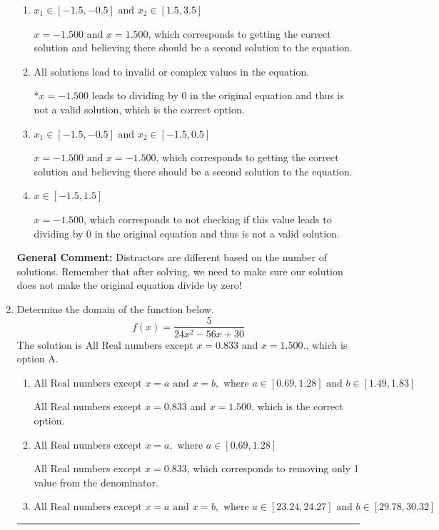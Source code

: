 \documentclass{extbook}[14pt]
\newcommand{\litem}[1]{\item #1

\rule{\textwidth}{0.4pt}}
\begin{document}
\begin{enumerate}
{\begin{enumerate}[label=\Alph*.]
$x = 1.500$, which corresponds to not distributing the factor $28x + 42$ correctly when trying to eliminate the fraction.
\item \( x_1 \in [-1.5, -0.5] \text{ and } x_2 \in [1.5,3.5] \)

$x = -1.500 \text{ and } x = 1.500$, which corresponds to getting the correct solution and believing there should be a second solution to the equation.
\item \( \text{All solutions lead to invalid or complex values in the equation.} \)

*$x = -1.500$ leads to dividing by 0 in the original equation and thus is not a valid solution, which is the correct option.
\item \( x_1 \in [-1.5, -0.5] \text{ and } x_2 \in [-1.5,0.5] \)

$x = -1.500 \text{ and } x = -1.500$, which corresponds to getting the correct solution and believing there should be a second solution to the equation.
\item \( x \in [-1.5,1.5] \)

$x = -1.500$, which corresponds to not checking if this value leads to dividing by 0 in the original equation and thus is not a valid solution.
\end{enumerate}

\textbf{General Comment:} Distractors are different based on the number of solutions. Remember that after solving, we need to make sure our solution does not make the original equation divide by zero!
}
\litem{
Determine the domain of the function below.
\[ f(x) = \frac{5}{24x^{2} -56 x + 30} \]The solution is \( \text{All Real numbers except } x = 0.833 \text{ and } x = 1.500. \), which is option A.\begin{enumerate}[label=\Alph*.]
\item \( \text{All Real numbers except } x = a \text{ and } x = b, \text{ where } a \in [0.69, 1.28] \text{ and } b \in [1.49, 1.83] \)

All Real numbers except $x = 0.833$ and $x = 1.500$, which is the correct option.
\item \( \text{All Real numbers except } x = a, \text{ where } a \in [0.69, 1.28] \)

All Real numbers except $x = 0.833$, which corresponds to removing only 1 value from the denominator.
\item \( \text{All Real numbers except } x = a \text{ and } x = b, \text{ where } a \in [23.24, 24.27] \text{ and } b \in [29.78, 30.32] \)


\end{enumerate}}
\end{enumerate}
\end{document}
